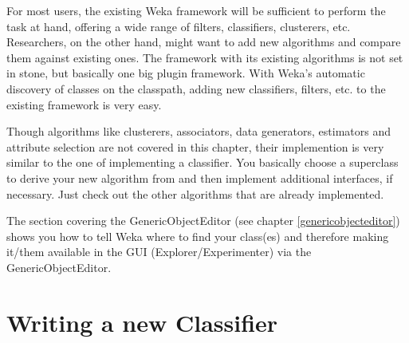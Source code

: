 %
%
%
%


For most users, the existing Weka framework will be sufficient to perform the
task at hand, offering a wide range of filters, classifiers, clusterers, etc.
Researchers, on the other hand, might want to add new algorithms and compare
them against existing ones. The framework with its existing algorithms is not
set in stone, but basically one big plugin framework. With Weka's automatic
discovery of classes on the classpath, adding new classifiers, filters, etc. to
the existing framework is very easy.

Though algorithms like clusterers, associators, data generators, estimators and
attribute selection are not covered in this chapter, their implemention is very
similar to the one of implementing a classifier. You basically choose a
superclass to derive your new algorithm from and then implement additional
interfaces, if necessary. Just check out the other algorithms that are already
implemented.

The section covering the GenericObjectEditor (see chapter
\ref{genericobjecteditor}) shows you how to tell Weka where to find your
class(es) and therefore making it/them available in the GUI
(Explorer/Experimenter) via the GenericObjectEditor.


\clearpage
\section{Writing a new Classifier}
